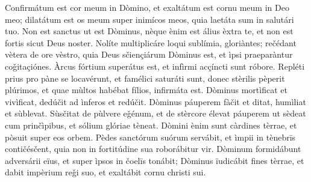 Confirmátum est cor meum in Dòmino, et exaltátum est cornu meum in Deo meo; dilatátum est os meum super inimícos meos, quia laetáta sum in salutári tuo.
Non est sanctus ut est Dòminus, nèque ènim est álius èxtra te, et non est fortis sicut Deus noster.
Nolíte multiplicáre loqui sublímia, gloriàntes; rečédant vètera de ore vèstro, quia Deus sčiençiárum Dòminus est, et ìpsi praeparàntur coǧitaçiónes.
Àrcus fórtium superátus est, et infìrmi acçíncti sunt róbore.
Repléti prius pro pàne se locavérunt, et famélici saturáti sunt, donec stèrilis pèperit plúrimos, et quae mùltos habébat fílios, infirmáta est.
Dòminus mortìficat et vivìficat, dedúčit ad ìnferos et redúčit.
Dòminus páuperem fàčit et ditat, humìliat et sùblevat.
Sùsčitat de pùlvere eǧénum, et de stèrcore élevat páuperem ut sèdeat cum prinčìpibus, et sólium glóriae tèneat. Dòmini ènim sunt càrdines tèrrae, et pòsuit super eos orbem.
Pèdes sanctórum suórum servábit, et ìmpii in tènebrīs contičésčent, quia non in fortitúdine sua roborábitur vir.
Dòminum formidábunt adversárii eïus, et super ìpsos in čoelīs tonábit; Dòminus ïudicábit fines tèrrae, et dabit impèrium reǧi suo, et exaltábit cornu christi sui.
